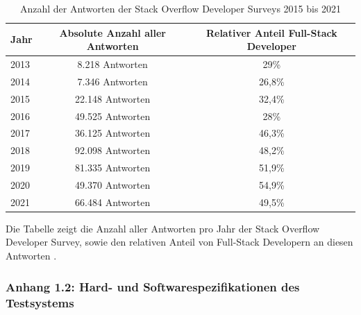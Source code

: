 \documentclass[a4paper]{scrartcl}
\begin{document}
\begin{table}[H]
	\centering
	\caption{Anzahl der Antworten der Stack Overflow Developer Surveys 2015 bis 2021}
	\begin{center}
		\begin{tabular}{| l | c | c |}
			\hline
			Jahr & Absolute Anzahl aller Antworten & Relativer Anteil Full-Stack Developer \\
			\hline \hline
			2013 & 8.218 Antworten & 29\% \\
			\hline
			2014 & 7.346 Antworten & 26,8\% \\
			\hline
			2015 & 22.148 Antworten & 32,4\% \\
			\hline 
			2016 & 49.525 Antworten & 28\% \\
			\hline 
			2017 & 36.125 Antworten & 46,3\% \\
			\hline 
			2018 & 92.098 Antworten & 48,2\% \\
			\hline
			2019 & 81.335 Antworten & 51,9\% \\
			\hline
			2020 & 49.370 Antworten & 54,9\% \\
			\hline
			2021 & 66.484 Antworten & 49,5\% \\
			\hline
		\end{tabular}
	\end{center}
	\justifying
	\small	
	Die Tabelle zeigt die Anzahl aller Antworten pro Jahr der Stack Overflow Developer Survey, sowie den relativen Anteil von Full-Stack Developern an diesen Antworten \autocite{stackoverflow_2015,stackoverflow_2016,stackoverflow_2017,stackoverflow_2018,stackoverflow_2019,stackoverflow_2020,stackoverflow_2021}.
\end{table}

\newpage

\subsubsection*{Anhang 1.2: Hard- und Softwarespezifikationen des Testsystems}
\end{document}
